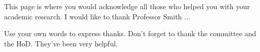   This page is where you would acknowledge all those who helped you
  with your academic research.  I would like to thank Professor Smith ...

  Use your own words to express thanks. Don't forget to thank the
  committee and the HoD. They've been very helpful. 
